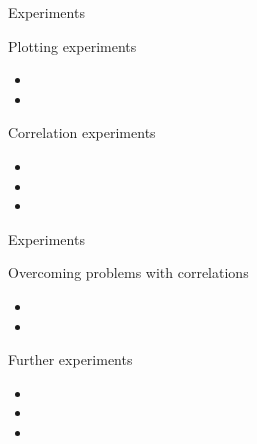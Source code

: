 \begin{frame}{Experiments}
	\begin{block}{Plotting experiments}
		\begin{itemize}
			\item \expi
			\item \expii		
		\end{itemize}
	\end{block}
	\begin{block}{Correlation experiments}
		\begin{itemize}
			\item \expiii			
			\item \expiv	
			\item \expv	
		\end{itemize}
	\end{block}
\end{frame}
\begin{frame}{Experiments}
	\begin{block}{Overcoming problems with correlations}
		\begin{itemize}
			\item \expvi
			\item \expvii
		\end{itemize}
	\end{block}
	\begin{block}{Further experiments}
		\begin{itemize}
			\item \expviii
			\item \expix
			\item \expx
		\end{itemize}
	\end{block}
\end{frame}